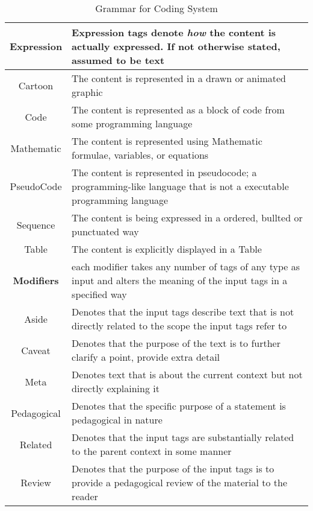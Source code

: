 \begin{table}[h!]
\begin{tabular}{c p{1.8\linewidth}}
    
    \textbf{Expression} & Expression tags denote \emph{how }the content is actually expressed. If not otherwise stated, assumed to be text \\
    \hline
    Cartoon & The content is represented in a drawn or animated graphic\\
    Code & The content is represented as a block of code from some programming language\\
    Mathematic & The content is represented using Mathematic formulae, variables, or equations\\
    PseudoCode & The content is represented in pseudocode; a programming-like language that is not a executable programming language\\
    Sequence & The content is being expressed in a ordered, bullted or punctuated way\\
    Table & The content is explicitly displayed in a Table\\


    \textbf{Modifiers} & each modifier takes any number of tags of any type as input and alters the meaning of the input tags in a specified way \\
    \hline
    Aside & Denotes that the input tags describe text that is not directly related to the scope the input tags refer to \\
    Caveat & Denotes that the purpose of the text is to further clarify a point, provide extra detail\\
    Meta & Denotes text that is about the current context but not directly explaining it\\
    Pedagogical & Denotes that the specific purpose of a statement is pedagogical in nature\\
    Related & Denotes that the input tags are substantially related to the parent context in some manner\\
    Review & Denotes that the purpose of the input tags is to provide a pedagogical review of the material to the reader\\
  \end{tabular}
  \caption{Grammar for Coding System}
  \label{res:tbl:grmr}
\end{table}
